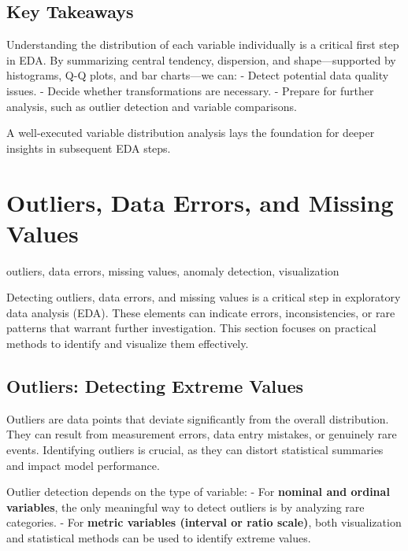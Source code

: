 \documentclass[12pt,openany]{book}
\begin{document}
\subsection{Key Takeaways}

Understanding the distribution of each variable individually is a critical first step in EDA. By summarizing central tendency, dispersion, and shape—supported by histograms, Q-Q plots, and bar charts—we can:
- Detect potential data quality issues.
- Decide whether transformations are necessary.
- Prepare for further analysis, such as outlier detection and variable comparisons.

A well-executed variable distribution analysis lays the foundation for deeper insights in subsequent EDA steps.



\section{Outliers, Data Errors, and Missing Values}

\begin{keywordsbox}
outliers, data errors, missing values, anomaly detection, visualization
\end{keywordsbox}

Detecting outliers, data errors, and missing values is a critical step in 
exploratory data analysis (EDA). These elements can indicate errors, 
inconsistencies, or rare patterns that warrant further investigation. 
This section focuses on practical methods to identify and visualize them 
effectively.


\subsection{Outliers: Detecting Extreme Values}

Outliers are data points that deviate significantly from the overall 
distribution. They can result from measurement errors, data entry 
mistakes, or genuinely rare events. Identifying outliers is crucial, 
as they can distort statistical summaries and impact model performance.
\newline

Outlier detection depends on the type of variable:  
\newline
- For \textbf{nominal and ordinal variables}, the only meaningful way to detect 
  outliers is by analyzing rare categories.  
\newline
- For \textbf{metric variables (interval or ratio scale)}, both visualization and 
  statistical methods can be used to identify extreme values.
\newline
\end{document}
